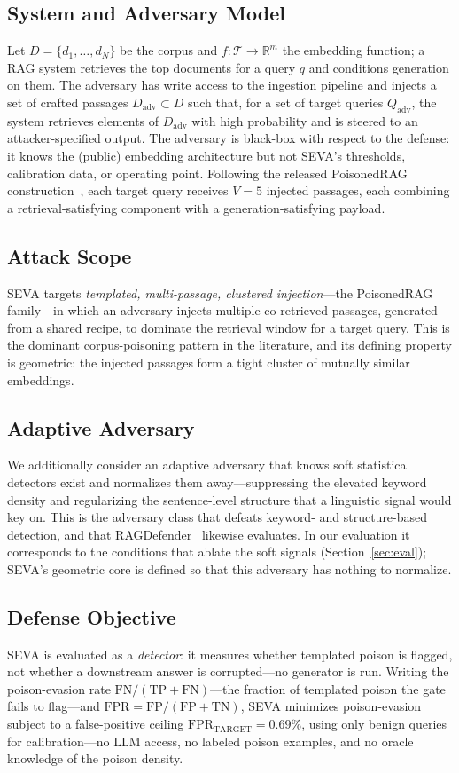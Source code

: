 \documentclass[10pt,journal,compsoc]{IEEEtran}
\begin{document}
\subsection{System and Adversary Model}
Let $D=\{d_1,\dots,d_N\}$ be the corpus and $f:\mathcal{T}\to\mathbb{R}^{m}$ the
embedding function; a RAG system retrieves the top documents for a query $q$ and
conditions generation on them. The adversary has write access to the ingestion
pipeline and injects a set of crafted passages $D_{\mathrm{adv}}\subset D$ such
that, for a set of target queries $Q_{\mathrm{adv}}$, the system retrieves
elements of $D_{\mathrm{adv}}$ with high probability and is steered to an
attacker-specified output. The adversary is black-box with respect to the
defense: it knows the (public) embedding architecture but not SEVA's thresholds,
calibration data, or operating point. Following the released PoisonedRAG
construction~\cite{poisonedrag}, each target query receives $V=5$ injected
passages, each combining a retrieval-satisfying component with a
generation-satisfying payload.

\subsection{Attack Scope}
SEVA targets \emph{templated, multi-passage, clustered injection}---the
PoisonedRAG family---in which an adversary injects multiple co-retrieved
passages, generated from a shared recipe, to dominate the retrieval window for a
target query. This is the dominant corpus-poisoning pattern in the literature,
and its defining property is geometric: the injected passages form a tight
cluster of mutually similar embeddings.

\subsection{Adaptive Adversary}
We additionally consider an adaptive adversary that knows soft statistical
detectors exist and normalizes them away---suppressing the elevated keyword
density and regularizing the sentence-level structure that a linguistic signal
would key on. This is the adversary class that defeats keyword- and
structure-based detection, and that RAGDefender~\cite{ragdefender} likewise
evaluates. In our evaluation it corresponds to the conditions that ablate the
soft signals (Section~\ref{sec:eval}); SEVA's geometric core is defined so that
this adversary has nothing to normalize.

\subsection{Defense Objective}
SEVA is evaluated as a \emph{detector}: it measures whether templated poison is
flagged, not whether a downstream answer is corrupted---no generator is run. Writing
the poison-evasion rate $\mathrm{FN}/(\mathrm{TP}+\mathrm{FN})$---the fraction of
templated poison the gate fails to flag---and
$\mathrm{FPR}=\mathrm{FP}/(\mathrm{FP}+\mathrm{TN})$, SEVA minimizes poison-evasion
subject to a false-positive ceiling
$\mathrm{FPR}_{\mathrm{TARGET}}=0.69\%$, using only benign queries for
calibration---no LLM access, no labeled poison examples, and no oracle knowledge
of the poison density.
\end{document}
